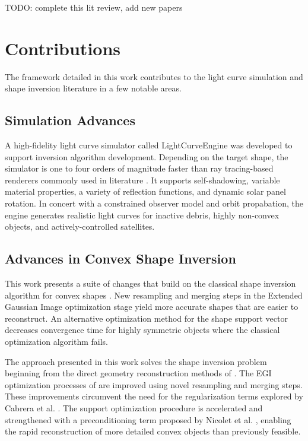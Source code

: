 TODO: complete this lit review, add new papers

\section{Contributions}

The framework detailed in this work contributes to the light curve simulation and shape inversion literature in a few notable areas. 

\subsection{Simulation Advances}

A high-fidelity light curve simulator called LightCurveEngine was developed to support inversion algorithm development. Depending on the target shape, the simulator is one to four orders of magnitude faster than ray tracing-based renderers commonly used in literature \cite{fan2019, allworth2020}. It supports self-shadowing, variable material properties, a variety of reflection functions, and dynamic solar panel rotation. In concert with a constrained observer model and orbit propabation, the engine generates realistic light curves for inactive debris, highly non-convex objects, and actively-controlled satellites. 

\subsection{Advances in Convex Shape Inversion}

This work presents a suite of changes that build on the classical shape inversion algorithm for convex shapes \cite{robinson2022}. New resampling and merging steps in the Extended Gaussian Image optimization stage yield more accurate shapes that are easier to reconstruct. An alternative optimization method for the shape support vector decreases convergence time for highly symmetric objects where the classical optimization algorithm fails.

The approach presented in this work solves the shape inversion problem beginning from the direct geometry reconstruction methods of \cite{kaasalainen2001,fan2020thesis}. The EGI optimization processes of \cite{fan2020thesis,cabrera2021,kaasalainen2001} are improved using novel resampling and merging steps. These improvements circumvent the need for the regularization terms explored by Cabrera et al. \cite{cabrera2021}. The support optimization procedure is accelerated and strengthened with a preconditioning term proposed by Nicolet et al. \cite{nicolet2021}, enabling the rapid reconstruction of more detailed convex objects than previously feasible.

